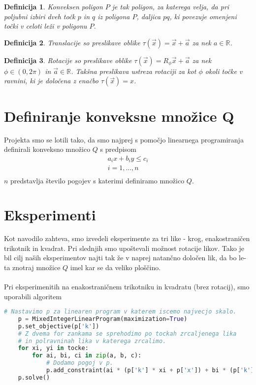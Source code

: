 \documentclass[a4paper, 12pt]{article}
\newtheorem{definicija}{Definicija}
\begin{document}
\begin{definicija}
    Konveksen poligon $P$ je tak poligon, za katerega velja, da pri poljubni izbiri dveh točk $p$ in $q$
     iz poligona $P$, daljica $pq$, ki povezuje omenjeni točki v celoti leži v poligonu $P$.
\end{definicija}

\begin{definicija}
    Translacije so preslikave oblike $\tau(\vec{x}) = \vec{x} + \vec{a}$ za nek $a \in \mathbb{R}$.
\end{definicija}

\begin{definicija}
    Rotacije so preslikave oblike $\tau (\vec{x}) = R_{\phi}\vec{x} + \vec{a}$ za nek $\phi \in (0, 2\pi)$ in $\vec{a} \in \mathbb{R}$. 
    Takšna preslikava ustreza rotaciji za kot $\phi$ okoli točke v ravnini, ki je določena z enačbo $\tau (\vec{x}) = x$. 
\end{definicija}


\section{Definiranje konveksne množice Q}
Projekta smo se lotili tako, da smo najprej s pomočjo linearnega programiranja definirali konveksno množico $Q$ s predpisom
\begin{align*}
    a_i x + b_i y \le c_i \\
    i = 1, ..., n \\
\end{align*}
$n$ predstavlja število pogojev s katerimi definiramo množico $Q$.
\newpage
\section{Eksperimenti}
Kot navodilo zahteva, smo izvedeli eksperimente za tri like - krog, enakostraničen trikotnik in kvadrat. Pri slednjih smo upoštevali možnost rotacije likov.
\newline
Tako je bil cilj naših eksperimentov najti tak že v naprej natančno določen lik, da bo le-ta znotraj množice $Q$ imel kar se da veliko ploščino.
\\~\\
Pri eksperimenitih na enakostraničnem trikotniku in kvadratu (brez rotacij), smo uporabili algoritem 
\begin{lstlisting}[language=Python]
    # Nastavimo p za linearen program v katerem iscemo najvecjo skalo.
    p = MixedIntegerLinearProgram(maximization=True)
    p.set_objective(p['k'])
    # Z dvema for zankama se sprehodimo po tockah zrcaljenega lika
    # in polravninah lika v katerega zrcalimo.
    for xi, yi in tocke:
        for ai, bi, ci in zip(a, b, c):
            # Dodamo pogoj v p.
            p.add_constraint(ai * (p['k'] * xi + p['x']) + bi * (p['k'] * yi + p['y']) <= ci)
    p.solve()
\end{lstlisting}
\end{document}
